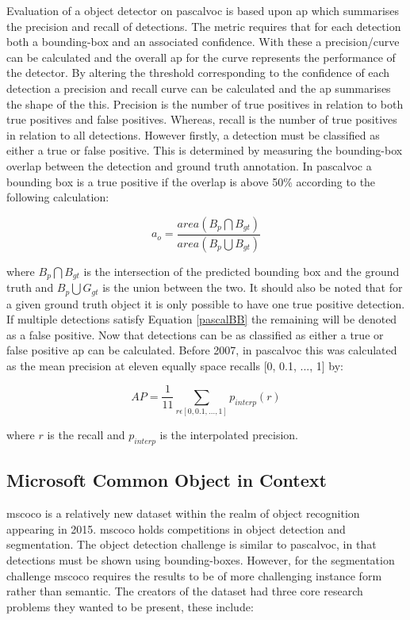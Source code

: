 Evaluation of a object detector on \gls{pascalvoc} is based upon \gls{ap} which summarises the precision and recall of detections. The metric requires that for each detection both a bounding-box and an associated confidence. With these a precision/curve can be calculated and the overall \gls{ap} for the curve represents the performance of the detector. By altering the threshold corresponding to the confidence of each detection a precision and recall curve can be calculated and the \gls{ap} summarises the shape of the this. Precision is the number of true positives in relation to both true positives and false positives. Whereas, recall is the number of true positives in relation to all detections. However firstly, a detection must be classified as either a true or false positive. This is determined by measuring the bounding-box overlap between the detection and ground truth annotation. In \gls{pascalvoc} a bounding box is a true positive if the overlap is above 50\% according to the following calculation:

\begin{equation}\label{pascalBB}
	a_o = \frac{area(B_p \bigcap B_{gt})}{area(B_p \bigcup B_{gt})}
\end{equation}
 
where $B_p \bigcap B_{gt}$ is the intersection of the predicted bounding box and the ground truth and $B_p \bigcup G_{gt}$ is the union between the two. It should also be noted that for a given ground truth object it is only possible to have one true positive detection. If multiple detections satisfy Equation \ref{pascalBB} the remaining will be denoted as a false positive. Now that detections can be as classified as either a true or false positive \gls{ap} can be calculated. Before 2007, in \gls{pascalvoc} this was calculated as the mean precision at eleven equally space recalls [0, 0.1, ..., 1] by:

\begin{equation}
	AP = \frac{1}{11} \sum_{r\epsilon[0, 0.1, ..., 1]}p_{interp}(r)  
\end{equation}

where $r$ is the recall and $p_{interp}$ is the interpolated precision.


\subsection{Microsoft Common Object in Context}
\gls{mscoco} \cite{mscoco} is a relatively new dataset within the realm of object recognition appearing in 2015. \gls{mscoco} holds competitions in object detection and segmentation. The object detection challenge is similar to \gls{pascalvoc}, in that detections must be shown using bounding-boxes. However, for the segmentation challenge \gls{mscoco} requires the results to be of more challenging instance form rather than semantic. The creators of the dataset had three core research problems they wanted to be present, these include:

